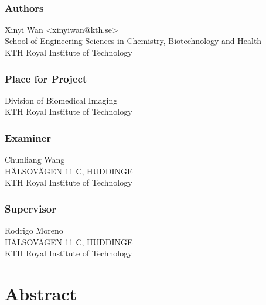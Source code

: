 \newpage
\thispagestyle{plain}
~\\
\vfill
{ 
	\subsection*{Authors}
	Xinyi Wan <xinyiwan@kth.se>\\
	School of Engineering Sciences in Chemistry, Biotechnology and Health\\
	KTH Royal Institute of Technology
	
	\subsection*{Place for Project}
	Division of Biomedical Imaging\\
	KTH Royal Institute of Technology
	
	\subsection*{Examiner}
	Chunliang Wang\\
	HÄLSOVÄGEN 11 C, HUDDINGE \\
	KTH Royal Institute of Technology
	
	\subsection*{Supervisor}
	Rodrigo Moreno\\
	HÄLSOVÄGEN 11 C, HUDDINGE\\
	KTH Royal Institute of Technology
	~
}


\newpage
\thispagestyle{plain}
\chapter*{Abstract}

